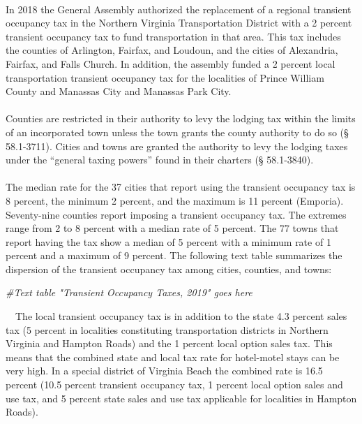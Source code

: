 \documentclass[
]{book}
\newenvironment{Shaded}{\begin{snugshade}}{\end{snugshade}}
\newcommand{\CommentTok}[1]{\textcolor[rgb]{0.56,0.35,0.01}{\textit{#1}}}
\begin{document}
~\\
\hspace*{0.333em}\hspace*{0.333em}In 2018 the General Assembly authorized the replacement of a regional transient occupancy tax in the Northern Virginia Transportation District with a 2 percent transient occupancy tax to fund transportation in that area. This tax includes the counties of Arlington, Fairfax, and Loudoun, and the cities of Alexandria, Fairfax, and Falls Church. In addition, the assembly funded a 2 percent local transportation transient occupancy tax for the localities of Prince William County and Manassas City and Manassas Park City.\\
~\\
\hspace*{0.333em}\hspace*{0.333em}Counties are restricted in their authority to levy the lodging tax within the limits of an incorporated town unless the town grants the county authority to do so (§ 58.1-3711). Cities and towns are granted the authority to levy the lodging taxes under the ``general taxing powers'' found in their charters (§ 58.1-3840).\\
~\\
\hspace*{0.333em}\hspace*{0.333em}The median rate for the 37 cities that report using the transient occupancy tax is 8 percent, the minimum 2 percent, and the maximum is 11 percent (Emporia). Seventy-nine counties report imposing a transient occupancy tax. The extremes range from 2 to 8 percent with a median rate of 5 percent. The 77 towns that report having the tax show a median of 5 percent with a minimum rate of 1 percent and a maximum of 9 percent. The following text table summarizes the dispersion of the transient occupancy tax among cities, counties, and towns:

\begin{Shaded}
\begin{Highlighting}[]
\CommentTok{\#Text table "Transient Occupancy Taxes, 2019" goes here}
\end{Highlighting}
\end{Shaded}

\hfill\break
~~The local transient occupancy tax is in addition to the state 4.3 percent sales tax (5 percent in localities constituting transportation districts in Northern Virginia and Hampton Roads) and the 1 percent local option sales tax. This means that the combined state and local tax rate for hotel-motel stays can be very high. In a special district of Virginia Beach the combined rate is 16.5 percent (10.5 percent transient occupancy tax, 1 percent local option sales and use tax, and 5 percent state sales and use tax applicable for localities in Hampton Roads).\\
\end{document}
